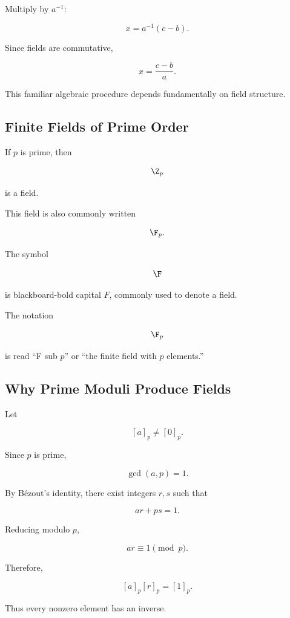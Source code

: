 Multiply by \(a^{-1}\):

\[ x=a^{-1}(c-b). \]

Since fields are commutative,

\[ x=\frac{c-b}{a}. \]

This familiar algebraic procedure depends fundamentally on field structure.

\subsection{Finite Fields of Prime Order}
\label{subsec:prime-fields-mod-p}

If \(p\) is prime, then

\[ \Z_p \]

is a field.

This field is also commonly written

\[ \F_p. \]

The symbol

\[ \F \]

is blackboard-bold capital \(F\), commonly used to denote a field.

The notation

\[ \F_p \]

is read ``F sub \(p\)'' or ``the finite field with \(p\) elements.''

\subsection{Why Prime Moduli Produce Fields}
\label{subsec:why-prime-moduli-fields}

Let

\[ [a]_p\neq[0]_p. \]

Since \(p\) is prime,

\[ \gcd(a,p)=1. \]

By Bézout's identity, there exist integers \(r,s\) such that

\[ ar+ps=1. \]

Reducing modulo \(p\),

\[ ar\equiv1\pmod p. \]

Therefore,

\[ [a]_p[r]_p=[1]_p. \]

Thus every nonzero element has an inverse.

